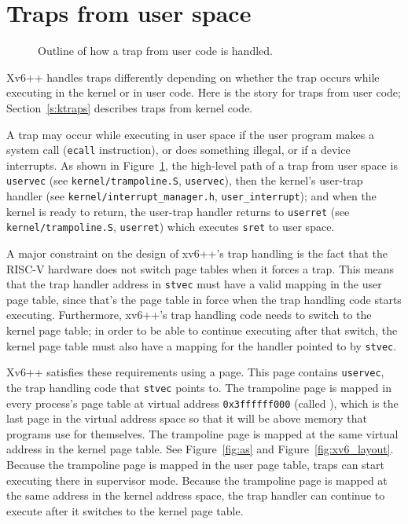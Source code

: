 \section{Traps from user space}
\begin{figure}[t]
  \begin{center}
    
  \end{center}
\caption{Outline of how a trap from user code is handled.}
\label{fig:usertrap}
\end{figure}

Xv6++ handles traps differently depending on whether
the trap occurs while
executing in the kernel or in user code. Here is the
story for traps from user code; Section~\ref{s:ktraps}
describes traps from kernel code.

A trap may occur while executing in user space if the
user program makes a
system call ({\tt ecall} instruction), or does something
illegal, or if a device interrupts.
As shown in Figure~\ref{fig:usertrap}, the high-level path of a trap from user space is
{\tt uservec}
(see \texttt{kernel/trampoline.S}, \texttt{uservec}),
then the kernel's user-trap handler
(see \texttt{kernel/interrupt\_manager.h}, \texttt{user\_interrupt});
and when the kernel is ready to return,
the user-trap handler returns to
{\tt userret}
(see \texttt{kernel/trampoline.S}, \texttt{userret})
which executes {\tt sret}
to user space.


A major constraint on the design of xv6++'s trap handling is the fact
that the RISC-V hardware does not switch page tables when it forces a
trap. This means that the trap handler
address in {\tt stvec} must have a valid
mapping in the user page table, since that's the page table in force
when the trap handling code starts executing. Furthermore, xv6++'s trap
handling code needs to switch to the kernel page table; in order to be
able to continue executing after that switch, the kernel page table
must also have a mapping for the handler pointed to by {\tt stvec}.

Xv6++ satisfies these requirements using a  page.
This page contains {\tt uservec}, the trap handling code
that {\tt stvec} points to. The trampoline page is mapped in
every process's page table at virtual address {\tt 0x3ffffff000}
(called ),
which is the last page in the virtual address space so that it will
be above memory that programs use for themselves.
The trampoline page is mapped at the same virtual address
in the kernel page table. See Figure~\ref{fig:as} and
Figure~\ref{fig:xv6_layout}. Because the trampoline page is mapped in
the user page table, traps can start
executing there in supervisor mode. Because the trampoline page is
mapped at the same address in the kernel address space, the trap handler
can continue to execute after it switches to the kernel page
table.

